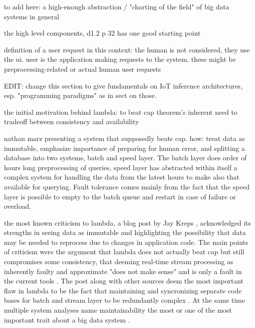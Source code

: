 to add here: a high-enough abstraction / "charting of the field" of big data systems in general

the high level components, d1.2 p 32 has one good starting point

definition of a user request in this context: the human is not considered, they use the ui. user is the application making requests to the system. these might be preprocessing-related or actual human user requests


EDIT: change this section to give fundamentals on IoT inference architectures, esp. "programming paradigms" as in \cite{iotsystems} sect on those.


the initial motivation behind lambda: to beat cap theorem's inherent need to tradeoff between consistency and availability \cite{lambdakappa}

nathan marz presenting a system that supposedly beats cap. how: treat data as immutable, emphasize importance of preparing for human error, and splitting a database into two systems, batch and speed layer. The batch layer does order of hours long preprocessing of queries, speed layer has  abstracted within itself a complex system for handling the data from the latest hours to make also that available for querying. Fault tolerance comes mainly from the fact that the speed layer is possible to empty to the batch queue and restart in case of failure or overload.

the most known criticism to lambda, a blog post by Jay Kreps \cite{questioninglambda}, acknowledged its strengths in seeing data as immutable and highlighting the possibility that data may be needed to reprocess due to changes in application code. The main points of criticism were the argument that lambda does not actually beat cap but still compromises some consistency, that deeming real-time stream processing as inherently faulty and approximate "does not make sense" and is only a fault in the current tools \cite{questioninglambda}. The post along with other sources deem the most important flaw in lambda to be the fact that maintaining and syncronizing separate code bases for batch and stream layer to be redundantly complex \cite{uber} \cite{facebook}. At the same time multiple system analyses name maintainability the most or one of the most important trait about a big data system \cite{facebook} \cite{storm@twitter}.

